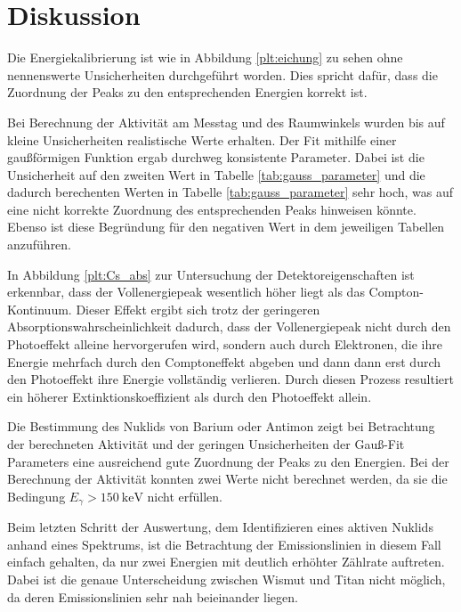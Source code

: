 \section{Diskussion}
\label{sec:Diskussion}
Die Energiekalibrierung ist wie in Abbildung \ref{plt:eichung}
zu sehen ohne nennenswerte Unsicherheiten durchgeführt worden. Dies spricht
dafür, dass die Zuordnung der Peaks zu den entsprechenden Energien korrekt ist.

Bei Berechnung der Aktivität am Messtag und des Raumwinkels wurden bis auf kleine
Unsicherheiten realistische Werte erhalten. Der Fit mithilfe einer gaußförmigen
Funktion ergab durchweg konsistente Parameter. Dabei ist die Unsicherheit auf
den zweiten Wert in Tabelle \ref{tab:gauss_parameter} und die dadurch
berechenten Werten in Tabelle \ref{tab:gauss_parameter} sehr hoch, was auf eine
nicht korrekte Zuordnung des entsprechenden Peaks hinweisen könnte. Ebenso ist
diese Begründung für den negativen Wert in dem jeweiligen Tabellen
anzuführen.

In Abbildung \ref{plt:Cs_abs} zur Untersuchung der Detektoreigenschaften ist erkennbar,
dass der Vollenergiepeak wesentlich höher liegt als
das Compton-Kontinuum. Dieser Effekt ergibt sich trotz der geringeren
Absorptionswahrscheinlichkeit dadurch, dass der Vollenergiepeak nicht durch den
Photoeffekt alleine hervorgerufen wird, sondern auch durch Elektronen, die ihre
Energie mehrfach durch den Comptoneffekt abgeben und dann dann erst durch den
Photoeffekt ihre Energie vollständig verlieren. Durch diesen Prozess resultiert
ein höherer Extinktionskoeffizient als durch den Photoeffekt allein.

Die Bestimmung des Nuklids von Barium oder Antimon zeigt bei Betrachtung der
berechneten Aktivität und der geringen Unsicherheiten der Gauß-Fit Parameters
eine ausreichend gute Zuordnung der Peaks zu den Energien. Bei der Berechnung
der Aktivität konnten zwei Werte nicht berechnet werden, da sie die Bedingung
$E_\gamma > \SI{150}{\kilo\electronvolt}$ nicht erfüllen. 

Beim letzten Schritt der Auswertung, dem Identifizieren eines aktiven Nuklids
anhand eines Spektrums, ist die Betrachtung der Emissionslinien in diesem Fall
einfach gehalten, da nur zwei Energien mit deutlich erhöhter Zählrate auftreten.
Dabei ist die genaue Unterscheidung zwischen Wismut und Titan nicht möglich, da
deren Emissionslinien sehr nah beieinander liegen.
